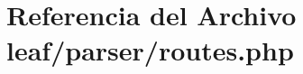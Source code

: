\hypertarget{routes_8php}{\section{Referencia del Archivo leaf/parser/routes.php}
\label{routes_8php}
}
